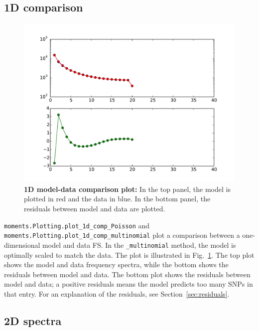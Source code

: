\documentclass[12pt]{article}
\makeatletter
\newcommand{\py}[1]{\lstinline[language=Python, showstringspaces=False]@#1@}
\makeatother
\begin{document}
\subsection{1D comparison}

\begin{figure}
\centering
\includegraphics[scale=0.5]{1d_comp}
\caption{\textbf{1D model-data comparison plot:} In the top panel, the model is plotted in red and the data in blue. In the bottom panel, the residuals between model and data are plotted.\label{fig:1d_comp}}
\end{figure}

\py{moments.Plotting.plot_1d_comp_Poisson} and \py{moments.Plotting.plot_1d_comp_multinomial} plot a comparison between a one-dimensional model and data FS.
In the \py{_multinomial} method, the model is optimally scaled to match the data.
The plot is illustrated in Fig.~\ref{fig:1d_comp}.
The top plot shows the model and data frequency spectra, while the bottom shows the residuals between model and data.
The bottom plot shows the residuals between model and data; a positive residuals means the model predicts too many SNPs in that entry.
For an explanation of the residuals, see Section~\ref{sec:residuals}.

\subsection{2D spectra}
\end{document}
